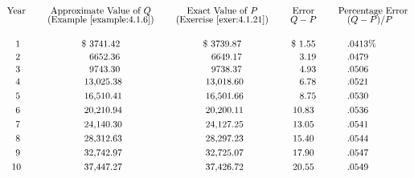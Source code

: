 \[
  \vbox{\tabskip=0pt \offinterlineskip \def\tablerule{\noalign{\hrule}} \halign{\hfill#\hfill&\qquad\hfill#\hfill&\qquad\hfill#\hfill &\qquad\hfill#\hfill&\qquad#\hfill\cr
  \noalign{\vskip12pt}
  \noalign{\vskip22pt} Year & Approximate Value of $Q$ & Exact Value of $P$ & Error & Percentage Error \cr & (Example~\ref{example:4.1.6}) & (Exercise~\ref{exer:4.1.21}) & $Q-P$ &\ \; $(Q-P)/P$ \cr \noalign{\vskip16pt} \  1 & \$ 3741.42 & \$ 3739.87 & \$ 1.55 &\ \; $.0413$\% \cr \noalign{\vskip7pt} \  2 &\  \, 6652.36 &\ \; 6649.17 &\ \; 3.19 &\ \; $.0479$ \cr \noalign{\vskip7pt} \  3 &\  \, 9743.30 &\ \; 9738.37 &\ \; 4.93 &\ \; $.0506$ \cr \noalign{\vskip7pt} \  4 & \, 13,025.38 & \, 13,018.60 &\ \; 6.78 &\ \; $.0521$ \cr \noalign{\vskip7pt} \  5 & \, 16,510.41 & \, 16,501.66 &\ \; 8.75 &\ \; $.0530$ \cr \noalign{\vskip7pt} \  6 & \, 20,210.94 & \, 20,200.11 & 10.83 &\ \; $.0536$ \cr \noalign{\vskip7pt} \  7 & \, 24,140.30 & \, 24,127.25 & 13.05 &\ \; $.0541$ \cr \noalign{\vskip7pt} \  8 & \, 28,312.63 & \, 28,297.23 & 15.40 &\ \; $.0544$ \cr \noalign{\vskip7pt} \  9 & \, 32,742.97 & \, 32,725.07 & 17.90 &\ \; $.0547$ \cr \noalign{\vskip7pt} 10 & \, 37,447.27 & \, 37,426.72 & 20.55 &\ \; $.0549$ \cr}}
\]

\exercises

